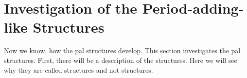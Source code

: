 \section{Investigation of the Period-adding-like Structures}
\label{sec:add.add}

Now we know, how the \gls{pal} structures develop.
This section investigates the \gls{pal} structures.
First, there will be a description of the structures.
Here we will see why they are called  structures and not  structures.






